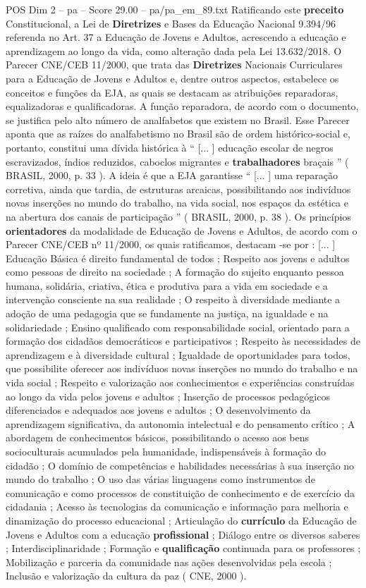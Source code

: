 \begin{textsample}{POS Dim 2 – pa – Score 29.00 – pa/pa\_em\_89.txt}
Ratificando este \textbf{preceito} Constitucional, a Lei de \textbf{Diretrizes} e Bases da Educação Nacional 9.394/96 referenda no Art. 37 a Educação de Jovens e Adultos, acrescendo a educação e aprendizagem ao longo da vida, como alteração dada pela Lei 13.632/2018.
O Parecer CNE/CEB 11/2000, que trata das \textbf{Diretrizes} Nacionais Curriculares para a Educação de Jovens e Adultos e, dentre outros aspectos, estabelece os conceitos e funções da EJA, as quais se destacam as atribuições reparadoras, equalizadoras e qualificadoras.
A função reparadora, de acordo com o documento, se justifica pelo alto número de analfabetos que existem no Brasil.
Esse Parecer aponta que as raízes do analfabetismo no Brasil são de ordem histórico-social e, portanto, constitui uma dívida histórica à “ [... ] educação escolar de negros escravizados, índios reduzidos, caboclos migrantes e \textbf{trabalhadores} braçais ” ( BRASIL, 2000, p. 33 ).
A ideia é que a EJA garantisse “ [... ] uma reparação corretiva, ainda que tardia, de estruturas arcaicas, possibilitando aos indivíduos novas inserções no mundo do trabalho, na vida social, nos espaços da estética e na abertura dos canais de participação ” ( BRASIL, 2000, p. 38 ).
Os princípios \textbf{orientadores} da modalidade de Educação de Jovens e Adultos, de acordo com o Parecer CNE/CEB nº 11/2000, os quais ratificamos, destacam -se por : [... ] Educação Básica é direito fundamental de todos ; Respeito aos jovens e adultos como pessoas de direito na sociedade ; A formação do sujeito enquanto pessoa humana, solidária, criativa, ética e produtiva para a vida em sociedade e a intervenção consciente na sua realidade ; O respeito à diversidade mediante a adoção de uma pedagogia que se fundamente na justiça, na igualdade e na solidariedade ; Ensino qualificado com responsabilidade social, orientado para a formação dos cidadãos democráticos e participativos ; Respeito às necessidades de aprendizagem e à diversidade cultural ; Igualdade de oportunidades para todos, que possibilite oferecer aos indivíduos novas inserções no mundo do trabalho e na vida social ; Respeito e valorização aos conhecimentos e experiências construídas ao longo da vida pelos jovens e adultos ; Inserção de processos pedagógicos diferenciados e adequados aos jovens e adultos ; O desenvolvimento da aprendizagem significativa, da autonomia intelectual e do pensamento crítico ; A abordagem de conhecimentos básicos, possibilitando o acesso aos bens socioculturais acumulados pela humanidade, indispensáveis à formação do cidadão ; O domínio de competências e habilidades necessárias à sua inserção no mundo do trabalho ; O uso das várias linguagens como instrumentos de comunicação e como processos de constituição de conhecimento e de exercício da cidadania ; Acesso às tecnologias da comunicação e informação para melhoria e dinamização do processo educacional ; Articulação do \textbf{currículo} da Educação de Jovens e Adultos com a educação \textbf{profissional} ; Diálogo entre os diversos saberes ; Interdisciplinaridade ; Formação e \textbf{qualificação} continuada para os professores ; Mobilização e parceria da comunidade nas ações desenvolvidas pela escola ; Inclusão e valorização da cultura da paz ( CNE, 2000 ).

\end{textsample}
